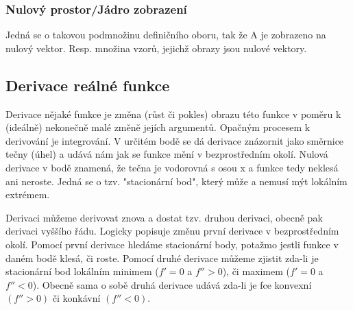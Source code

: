 \documentclass[10pt,a4paper]{article}
\begin{document}
\subsubsection{Nulový prostor/Jádro zobrazení}
Jedná se o takovou podmnožinu definičního oboru, tak že A je zobrazeno na nulový vektor. Resp. množina vzorů, jejichž obrazy jsou nulové vektory.
\subsection{Derivace reálné funkce}
Derivace nějaké funkce je změna (růst či pokles) obrazu této funkce v poměru k (ideálně) nekonečně malé změně jejích argumentů. Opačným procesem k derivování je integrování. V určitém bodě se dá derivace znázornit jako směrnice tečny (úhel) a udává nám jak se funkce mění v bezprostředním okolí. Nulová derivace v bodě znamená, že tečna je vodorovná s osou x a funkce tedy neklesá ani neroste. Jedná se o tzv. "stacionární bod", který může a nemusí mýt lokálním extrémem.\par
Derivaci můžeme derivovat znova a dostat tzv. druhou derivaci, obecně pak derivaci vyššího řádu. Logicky popisuje změnu první derivace v bezprostředním okolí. Pomocí první derivace hledáme stacionární body, potažmo jestli funkce v daném bodě klesá, či roste. Pomocí druhé derivace můžeme zjistit zda-li je stacionární bod lokálním minimem ($f'= 0$ a $f''>0$), či maximem ($f'= 0$ a $ f''<0$). Obecně sama o sobě druhá derivace udává zda-li je fce konvexní $(f''>0)$ či konkávní $(f''<0)$.
\end{document}

